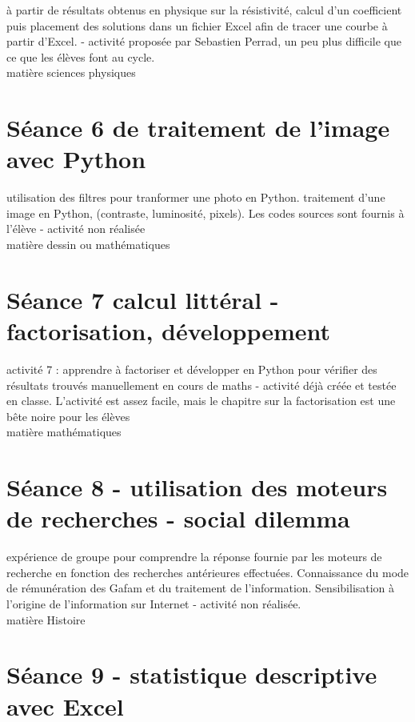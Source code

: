 \documentclass{moncours}
\begin{document}
à partir de résultats obtenus en physique sur la résistivité, calcul d'un coefficient puis placement des solutions dans un fichier Excel afin de tracer une courbe à partir d'Excel. - activité proposée par Sebastien Perrad, un peu plus difficile que ce que les élèves font au cycle.\\

matière sciences physiques

\section{Séance 6 de traitement de l'image avec Python}

utilisation des filtres pour tranformer une photo en Python. traitement d'une image en Python, (contraste, luminosité, pixels). Les codes sources sont fournis à l'élève - activité non réalisée\\

 matière dessin ou mathématiques

\section{Séance 7 calcul littéral - factorisation, développement}

activité 7 : apprendre à factoriser et développer en Python pour vérifier des résultats trouvés manuellement en cours de maths - activité déjà créée et testée en classe. L'activité est assez facile, mais le chapitre sur la factorisation est une bête noire pour les élèves\\

matière mathématiques


\section{Séance 8 - utilisation des moteurs de recherches - social dilemma}

expérience de groupe pour comprendre la réponse fournie par les moteurs de recherche en fonction des recherches antérieures effectuées. Connaissance du mode de rémunération des Gafam et du traitement de l'information. Sensibilisation à l'origine de l'information sur Internet - activité non réalisée.\\

matière Histoire


\section{Séance 9 - statistique descriptive avec Excel}
\end{document}
